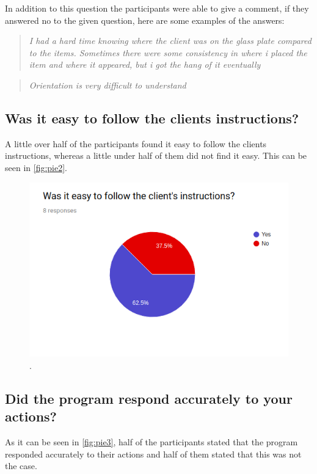 In addition to this question the participants were able to give a comment, if they answered no to the given question, here are some examples of the answers:\\

 \begin{quote}
 	
 	\textit{I had a hard time knowing where the client was on the glass plate compared to the items. Sometimes there were some consistency in where i placed the item and where it appeared, but i got the hang of it eventually}
  \end{quote}
  
  \begin{quote}
  \textit{Orientation is very difficult to understand}
  \end{quote}	
 	 

\subsection*{Was it easy to follow the clients instructions?}
A little over half of the participants found it easy to follow the clients instructions, whereas a little under half of them did not find it easy. This can be seen in \autoref{fig:pie2}.

\begin{figure}[H]
	\centering
	\includegraphics[width=0.9\linewidth]{figure/Evaluation/pie2.png}
	\caption{.}
	\label{fig:pie2}
\end{figure}

\subsection*{Did the program respond accurately to your actions?}
As it can be seen in \autoref{fig:pie3}, half of the participants stated that the program responded accurately to their actions and half of them stated that this was not the case.

